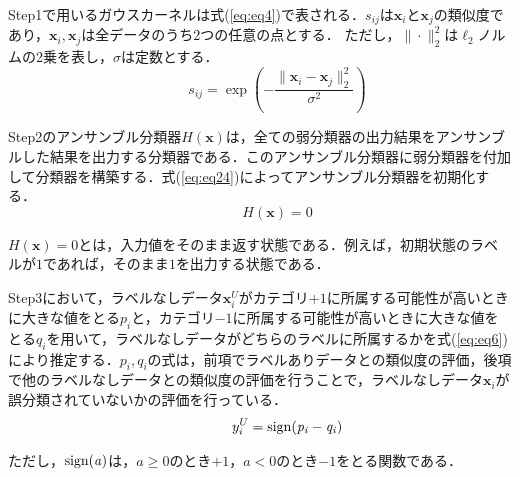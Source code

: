 Step1で用いるガウスカーネル\cite{kernel}は式(\ref{eq:eq4})で表される．$s_{ij}$は$\bm{x}_i$と$\bm{x}_j$の類似度であり，$\bm{x}_i,\bm{x}_j$は全データのうち2つの任意の点とする．
ただし，$\|\cdot \|_2^2$は$\ell_2$ノルムの2乗を表し，$\sigma$は定数とする．
\begin{equation}
\label{eq:eq4}
 \hspace{30pt} s_{ij} = \exp\left(-\frac{\|\bm{x}_i -\bm{x}_j \|_2^2}{\sigma^2}\right)
\end{equation}\par
\par


Step2のアンサンブル分類器$H(\bm{x})$は，全ての弱分類器の出力結果をアンサンブルした結果を出力する分類器である．このアンサンブル分類器に弱分類器を付加して分類器を構築する．式(\ref{eq:eq24})によってアンサンブル分類器を初期化する．
\begin{equation}
\label{eq:eq24}
 \hspace{30pt} H(\bm{x}) = 0
\end{equation}\par
$H(\bm{x}) = 0$とは，入力値をそのまま返す状態である．例えば，初期状態のラベルが$1$であれば，そのまま$1$を出力する状態である．\par

\newpage
Step3において，ラベルなしデータ$\bm{x}_i^U$がカテゴリ$+1$に所属する可能性が高いときに大きな値をとる$p_i$と，カテゴリ$-1$に所属する可能性が高いときに大きな値をとる$q_i$を用いて，ラベルなしデータがどちらのラベルに所属するかを式(\ref{eq:eq6})により推定する．$p_i, q_i$の式は，前項でラベルありデータとの類似度の評価，後項で他のラベルなしデータとの類似度の評価を行うことで，ラベルなしデータ$\bm{x}_i$が誤分類されていないかの評価を行っている．
\begin{eqnarray}
\label{eq:eq6}
 \hspace{40pt} y_i^U = \rm{sign}\it{(p_i - q_i)}
\end{eqnarray}\par
ただし，$\rm{sign}(\it a)$は，$a \geq 0$のとき$+1$，$a < 0$のとき$-1$をとる関数である．\par

